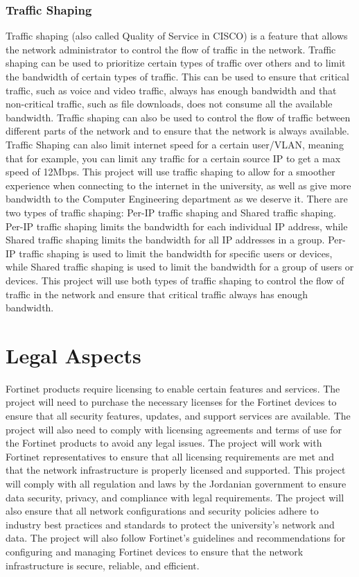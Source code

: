\documentclass[12pt]{report}
\begin{document}
\subsubsection{Traffic Shaping}
Traffic shaping (also called Quality of Service in CISCO) is a feature that allows the network administrator to control the flow of traffic in the network. Traffic shaping can be used to prioritize certain types of traffic over others and to limit the bandwidth of certain types of traffic. This can be used to ensure that critical traffic, such as voice and video traffic, always has enough bandwidth and that non-critical traffic, such as file downloads, does not consume all the available bandwidth. Traffic shaping can also be used to control the flow of traffic between different parts of the network and to ensure that the network is always available. Traffic Shaping can also limit internet speed for a certain user/VLAN, meaning that for example, you can limit any traffic for a certain source IP to get a max speed of 12Mbps. This project will use traffic shaping to allow for a smoother experience when connecting to the internet in the university, as well as give more bandwidth to the Computer Engineering department as we deserve it.
There are two types of traffic shaping: Per-IP traffic shaping and Shared traffic shaping. Per-IP traffic shaping limits the bandwidth for each individual IP address, while Shared traffic shaping limits the bandwidth for all IP addresses in a group. Per-IP traffic shaping is used to limit the bandwidth for specific users or devices, while Shared traffic shaping is used to limit the bandwidth for a group of users or devices. This project will use both types of traffic shaping to control the flow of traffic in the network and ensure that critical traffic always has enough bandwidth. \cite{SharedTrafficShaping} \cite{PerIPTrafficShaping}
\section{Legal Aspects}
Fortinet products require licensing to enable certain features and services. The project will need to purchase the necessary licenses for the Fortinet devices to ensure that all security features, updates, and support services are available. The project will also need to comply with licensing agreements and terms of use for the Fortinet products to avoid any legal issues. The project will work with Fortinet representatives to ensure that all licensing requirements are met and that the network infrastructure is properly licensed and supported.
This project will comply with all regulation and laws by the Jordanian government to ensure data security, privacy, and compliance with legal requirements. The project will also ensure that all network configurations and security policies adhere to industry best practices and standards to protect the university's network and data. The project will also follow Fortinet's guidelines and recommendations for configuring and managing Fortinet devices to ensure that the network infrastructure is secure, reliable, and efficient. 
\end{document}
